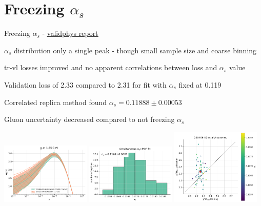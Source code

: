 \documentclass[aspectratio=169,10pt]{beamer}
\begin{document}
\section*{Freezing $\alpha_s$}

\begin{frame}[t]{Freezing $\alpha_s$ - \underline{\href{https://vp.nnpdf.science/J-wRSP3IRxeAMYoImWktBQ==/}{validphys report}}}

  $\alpha_s$ distribution only a single peak - though small sample size and coarse binning\\\vspace*{0.5em}
  
  tr-vl losses improved and no apparent correlations between loss and $\alpha_s$ value\\\vspace*{0.5em}

  Validation loss of 2.33 compared to 2.31 for fit with $\alpha_s$ fixed at 0.119\\\vspace*{0.5em}

  Correlated replica method found $\alpha_s= 0.11888 \pm 0.00053$\\\vspace*{0.5em}

  Gluon uncertainty decreased compared to not freezing $\alpha_s$

  \vspace*{-8mm}
  \includegraphics[width=0.32\textwidth]{PDFnormalize0_Basespecs0_PDFscalespecs0_plot_pdfs_g_frac75.pdf}  
  \includegraphics[width=0.32\textwidth]{alphas_hist_frac75.pdf}
  \includegraphics[width=0.32\textwidth]{plot_training_validation_frac75.pdf}

\end{frame}
\end{document}
